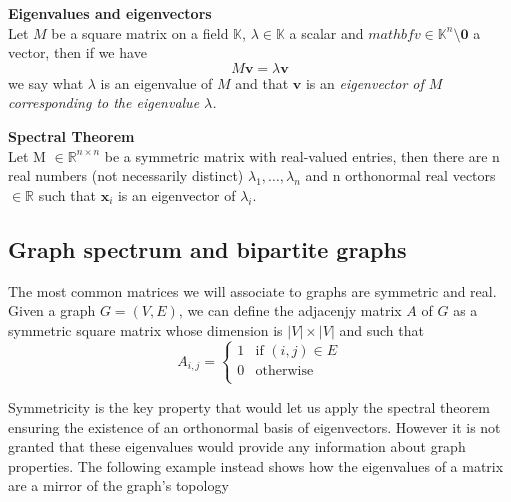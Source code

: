 \begin{definition}{\textbf{Eigenvalues and eigenvectors}} \\
Let $ M $ be a square matrix on a field $ \mathbb{K} $, $ \lambda \in \mathbb{K} $ a scalar and $ mathbf{v} \in \mathbb{K}^n \setminus {\mathbf{0}}$ a vector, then if we have
\[M\mathbf{v}=\lambda\mathbf{v}\]
we say what $ \lambda $ is an eigenvalue of $ M $ and that $ \mathbf{v} $ is an \em{eigenvector} of $ M $ corresponding to the \em{eigenvalue} $ \lambda $.
\end{definition}

\begin{theorem}{\textbf{Spectral Theorem}} \\
Let M $\in \mathbb{R}^{n \times n}$ be a symmetric matrix with real-valued entries, then there are n real numbers (not necessarily distinct) $\lambda_1, \dots, \lambda_n$ and n orthonormal real vectors $\in \mathbb{R}$ such that $\mathbf{x}_i$ is an eigenvector of $\lambda_i$.
\end{theorem}

\subsection{Graph spectrum and bipartite graphs}
The most common matrices we will associate to graphs are symmetric and real.
Given a graph $ G=(V,E) $, we can define the adjacenjy matrix $ A $ of $ G $ as a symmetric square matrix whose dimension is $ |V| \times |V| $ and such that
\begin{equation*}
A_{i,j} = \begin{cases}
1 & \text{if } (i,j) \in E \\
0 & \text{otherwise }\\
\end{cases}
\end{equation*}

Symmetricity is the key property that would let us apply the spectral theorem ensuring the existence of an orthonormal basis of eigenvectors. However it is not granted that these eigenvalues would provide any information about graph properties. The following example instead shows how the eigenvalues of a matrix are a mirror of the graph's topology

